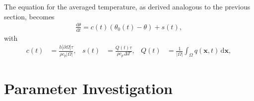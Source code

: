 \documentclass{beamer}
\newcommand{\deriv}[2]{\frac{\mathrm{d} #1}{\mathrm{d} #2}}
\begin{document}
\begin{frame}
 The equation for the averaged 
temperature, as derived analogous to the previous section, becomes
\begin{align}
\label{eq:aveode}
    \deriv{\theta}{t} = 
    c(t)(\theta_0(t) - \theta) + s(t),
\end{align}
with
\begin{align}
\label{params}
    c(t) &= \frac{h|\partial \Omega|\tau}{\rho c_p|\Omega|},&
    s(t) &= \frac{Q(t)\tau}{\rho c_p\Delta T},&
    Q(t) &= \frac{1}{|\Omega|}\int_{\Omega}
    q(\mathbf{x},t)\,\mathrm{d} \mathbf{x},
\end{align}
\end{frame}

\section{Parameter Investigation}
\end{document}
